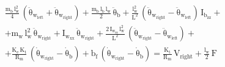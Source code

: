 \documentclass[11pt]{article}
\begin{document}
\[
  \mathrm{
    \begin{aligned}
      & \frac{m_b \, l_w^2}{4} \, ( \ddot{\theta}_{w_{left}} + \ddot{\theta}_{w_{right}} ) + \frac{m_b \, l_b \, l_w}{2} \, \ddot{\theta}_b + \frac{l_w^2}{L^2} \, ( \ddot{\theta}_{w_{right}} - \ddot{\theta}_{w_{left}} ) \, I_{b_{zz}} + \\
      & + m_w \, l_w^2 \, \ddot{\theta}_{w_{right}} + I_{w_{xx}} \, \ddot{\theta}_{w_{right}} + \frac{2 \, I_{w_{zz}} \, l_w^2}{L^2} \, ( \ddot{\theta}_{w_{right}} - \ddot{\theta}_{w_{left}} ) + \\
      & + \frac{K_e \, K_t}{R_m} \, ( \dot{\theta}_{w_{right}} - \dot{\theta}_b ) + b_f \, ( \dot{\theta}_{w_{right}} - \dot{\theta}_b ) = \frac{K_t}{R_m} \, V_{right} + \frac{l_w}{2} \, F
    \end{aligned}
  }
\]
\end{document}
